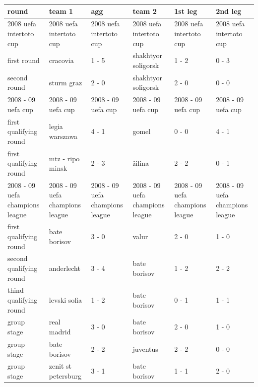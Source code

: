\documentclass{article}
\begin{document}
\begin{tabular}{llllll}
\toprule
round & team 1 & agg & team 2 & 1st leg & 2nd leg \\
\midrule
2008 uefa intertoto cup & 2008 uefa intertoto cup & 2008 uefa intertoto cup & 2008 uefa intertoto cup & 2008 uefa intertoto cup & 2008 uefa intertoto cup \\
first round & cracovia & 1 - 5 & shakhtyor soligorsk & 1 - 2 & 0 - 3 \\
second round & sturm graz & 2 - 0 & shakhtyor soligorsk & 2 - 0 & 0 - 0 \\
2008 - 09 uefa cup & 2008 - 09 uefa cup & 2008 - 09 uefa cup & 2008 - 09 uefa cup & 2008 - 09 uefa cup & 2008 - 09 uefa cup \\
first qualifying round & legia warszawa & 4 - 1 & gomel & 0 - 0 & 4 - 1 \\
first qualifying round & mtz - ripo minsk & 2 - 3 & žilina & 2 - 2 & 0 - 1 \\
2008 - 09 uefa champions league & 2008 - 09 uefa champions league & 2008 - 09 uefa champions league & 2008 - 09 uefa champions league & 2008 - 09 uefa champions league & 2008 - 09 uefa champions league \\
first qualifying round & bate borisov & 3 - 0 & valur & 2 - 0 & 1 - 0 \\
second qualifying round & anderlecht & 3 - 4 & bate borisov & 1 - 2 & 2 - 2 \\
thind qualifying round & levski sofia & 1 - 2 & bate borisov & 0 - 1 & 1 - 1 \\
group stage & real madrid & 3 - 0 & bate borisov & 2 - 0 & 1 - 0 \\
group stage & bate borisov & 2 - 2 & juventus & 2 - 2 & 0 - 0 \\
group stage & zenit st petersburg & 3 - 1 & bate borisov & 1 - 1 & 2 - 0 \\
\bottomrule
\end{tabular}
\end{document}
